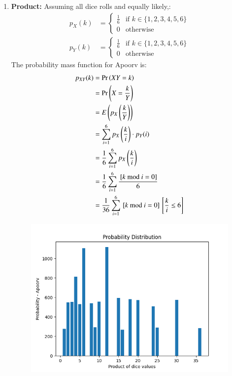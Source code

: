 \documentclass[journal,12pt,twocolumn]{IEEEtran}
\theoremstyle{remark}
\begin{document}
\begin{enumerate}
    \item \textbf{Product:} Assuming all dice rolls and equally likely,:
\begin{align}
    p_X(k) &= 
    \begin{cases}
        \frac{1}{6} & \text{if }k \in \{1, 2, 3, 4, 5, 6\}\\
        0 & \text{otherwise}
    \end{cases}\label{eq:1}\\
    p_Y(k) &=
    \begin{cases}
        \frac{1}{6} & \text{if }k \in \{1, 2, 3, 4, 5, 6\}\\
        0 & \text{otherwise}
    \end{cases}
\end{align}
The probability mass function for Apoorv is:
\begin{align}
    p_{XY}(k) &= \Pr\left(XY = k\right)\\
    &= \Pr\left(X = \frac{k}{Y}\right)\\
    &= E\left(p_X\left(\frac{k}{Y}\right)\right)\\
    &= \sum_{i = 1}^{6} p_X\left(\frac{k}{i}\right) \cdot p_Y(i)\\
    &= \frac{1}{6} \sum_{i = 1}^{6} p_X\left(\frac{k}{i}\right)\\
    &= \frac{1}{6} \sum_{i = 1}^{6} \frac{{}\left[k \text{ mod } i = 0\right]}{6}\\
    &= \frac{1}{36} \sum_{i = 1}^{6} {}\left[k \text{ mod } i = 0\right]{}\left[\frac{k}{i} \leq 6\right]
\end{align}
\begin{figure}[h!]
    \includegraphics[width=\columnwidth]{plots/PDF - Apoorv.png}

\end{figure}
\end{enumerate}
\end{document}
